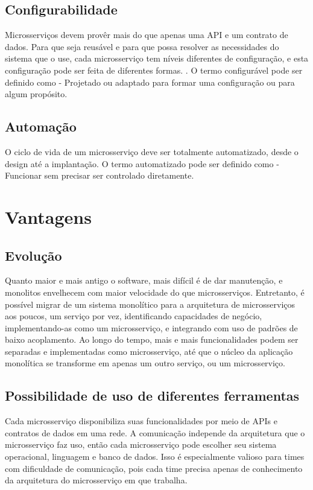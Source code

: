 \subsection{Configurabilidade}

Microsserviços devem provêr mais do que apenas uma API e um contrato de dados. Para que seja reusável e para que possa resolver as necessidades do sistema que o use, cada microsserviço tem níveis diferentes de configuração, e esta configuração pode ser feita de diferentes formas. \cite{Familiar2015}. O termo configurável pode ser definido como - Projetado ou adaptado para formar uma configuração ou para algum propósito.

\subsection {Automação}

O ciclo de vida de um microsserviço deve ser totalmente automatizado, desde o design até a implantação. O termo automatizado pode ser definido como - Funcionar sem precisar ser controlado diretamente.

\section{Vantagens}

\subsection{Evolução}

Quanto maior e mais antigo o software, mais difícil é de dar manutenção, e monolitos envelhecem com maior velocidade do que microsserviços. Entretanto, é possível migrar de um sistema monolítico para a arquitetura de microsserviços aos poucos, um serviço por vez, identificando capacidades de negócio, implementando-as como um microsserviço, e integrando com uso de padrões de baixo acoplamento. Ao longo do tempo, mais e mais funcionalidades podem ser separadas e implementadas como microsserviço, até que o núcleo da aplicação monolítica se transforme em apenas um outro serviço, ou um microsserviço. \cite{Familiar2015}

\subsection{Possibilidade de uso de diferentes ferramentas}

Cada microsserviço disponibiliza suas funcionalidades por meio de APIs e contratos de dados em uma rede. A comunicação independe da arquitetura que o microsserviço faz uso, então cada microsserviço pode escolher seu sistema operacional, linguagem e banco de dados. Isso é especialmente valioso para times com dificuldade de comunicação, pois cada time precisa apenas de conhecimento da arquitetura do microsserviço em que trabalha. \cite{Familiar2015}

